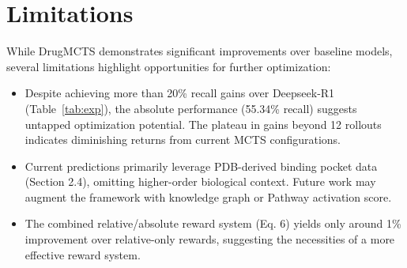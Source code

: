 \documentclass[letterpaper,twocolumn,10pt]{llncs}
\begin{document}
\section{Limitations}
While DrugMCTS demonstrates significant improvements over baseline models, several limitations highlight opportunities for further optimization:

\begin{itemize}
    \item Despite achieving more than 20\% recall gains over Deepseek-R1 (Table~\ref{tab:exp}), the absolute performance (55.34\% recall) suggests untapped optimization potential. The plateau in gains beyond 12 rollouts indicates diminishing returns from current MCTS configurations. 
    \item Current predictions primarily leverage PDB-derived binding pocket data (Section 2.4), omitting higher-order biological context. Future work may augment the framework with knowledge graph or Pathway activation score.
    \item The combined relative/absolute reward system (Eq. 6) yields only around 1\% improvement over relative-only rewards, suggesting the necessities of a more effective reward system. 
\end{itemize}
\end{document}
